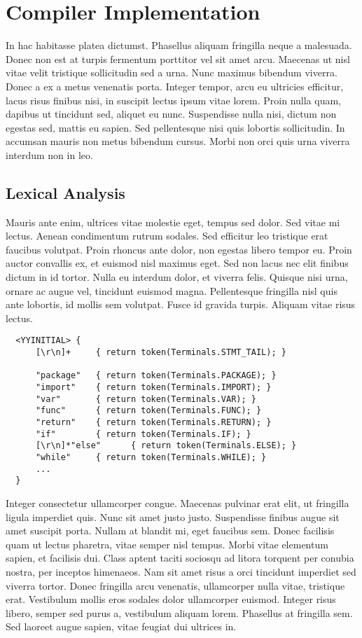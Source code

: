 \chapter{Compiler Implementation}
In hac habitasse platea dictumst. Phasellus aliquam fringilla neque a malesuada. Donec non est at turpis fermentum porttitor vel sit amet arcu. Maecenas ut nisl vitae velit tristique sollicitudin sed a urna. Nunc maximus bibendum viverra. Donec a ex a metus venenatis porta. Integer tempor, arcu eu ultricies efficitur, lacus risus finibus nisi, in suscipit lectus ipsum vitae lorem. Proin nulla quam, dapibus ut tincidunt sed, aliquet eu nunc. Suspendisse nulla nisi, dictum non egestas sed, mattis eu sapien. Sed pellentesque nisi quis lobortis sollicitudin. In accumsan mauris non metus bibendum cursus. Morbi non orci quis urna viverra interdum non in leo.


\section{Lexical Analysis}
Mauris ante enim, ultrices vitae molestie eget, tempus sed dolor. Sed vitae mi lectus. Aenean condimentum rutrum sodales. Sed efficitur leo tristique erat faucibus volutpat. Proin rhoncus ante dolor, non egestas libero tempor eu. Proin auctor convallis ex, et euismod nisl maximus eget. Sed non lacus nec elit finibus dictum in id tortor. Nulla eu interdum dolor, et viverra felis. Quisque nisi urna, ornare ac augue vel, tincidunt euismod magna. Pellentesque fringilla nisl quis ante lobortis, id mollis sem volutpat. Fusce id gravida turpis. Aliquam vitae risus lectus.
\begin{lstlisting}
  <YYINITIAL> {
      [\r\n]+     { return token(Terminals.STMT_TAIL); }

      "package"   { return token(Terminals.PACKAGE); }
      "import"    { return token(Terminals.IMPORT); }
      "var"       { return token(Terminals.VAR); }
      "func"      { return token(Terminals.FUNC); }
      "return"    { return token(Terminals.RETURN); }
      "if"        { return token(Terminals.IF); }
      [\r\n]*"else"      { return token(Terminals.ELSE); }
      "while"     { return token(Terminals.WHILE); }
      ...
  }
\end{lstlisting}
Integer consectetur ullamcorper congue. Maecenas pulvinar erat elit, ut fringilla ligula imperdiet quis. Nunc sit amet justo justo. Suspendisse finibus augue sit amet suscipit porta. Nullam at blandit mi, eget faucibus sem. Donec facilisis quam ut lectus pharetra, vitae semper nisl tempus. Morbi vitae elementum sapien, et facilisis dui. Class aptent taciti sociosqu ad litora torquent per conubia nostra, per inceptos himenaeos. Nam sit amet risus a orci tincidunt imperdiet sed viverra tortor. Donec fringilla arcu venenatis, ullamcorper nulla vitae, tristique erat. Vestibulum mollis eros sodales dolor ullamcorper euismod. Integer risus libero, semper sed purus a, vestibulum aliquam lorem. Phasellus at fringilla sem. Sed laoreet augue sapien, vitae feugiat dui ultrices in.


